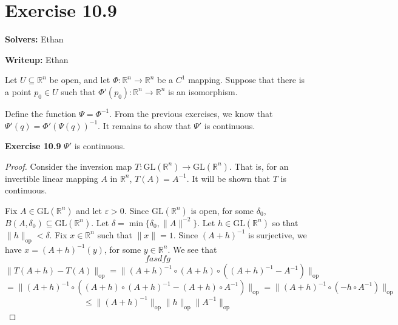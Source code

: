 \documentclass{article}
\newcommand{\op}{\mathrm{op}}
\newcommand{\GL}{\mathrm{GL}}
\theoremstyle{plain} %
\numberwithin{thm}{section} %
\theoremstyle{definition}
\begin{document}
    \section*{Exercise 10.9}
    \textbf{Solvers:} Ethan

    \noindent\textbf{Writeup:} Ethan

    Let \(U \subseteq \mathbb{R}^n\) be open, and let \(\Phi : \mathbb{R}^n \to \mathbb{R}^n\) be a \(C^1\) mapping. Suppose that there is a point \(p_0 \in U\) such that \(\Phi '(p_0) : \mathbb{R}^n \to \mathbb{R}^n\) is an isomorphism.

    \medskip

    Define the function \(\Psi = \Phi ^{-1}\). From the previous exercises, we know that \(\Psi '(q) = \Phi '(\Psi (q)) ^{-1}\). It remains to show that \(\Psi '\) is continuous.

    \noindent\textbf{Exercise 10.9} \(\Psi '\) is continuous.

    \begin{proof}
        Consider the inversion map \(T : \GL(\mathbb{R}^n) \to \GL(\mathbb{R}^n)\). That is, for an invertible linear mapping \(A\) in \(\mathbb{R}^n\), \(T(A) = A^{-1}\). It will be shown that \(T\) is continuous.

        Fix \(A \in \GL(\mathbb{R}^n)\) and let \(\varepsilon > 0\). Since \(\GL(\mathbb{R}^n)\) is open, for some \(\delta _0\), \(B(A, \delta _0) \subseteq \GL(\mathbb{R}^n)\). Let \(\delta = \min \{\delta _0, \|A\|^{-2}\}\). Let \(h \in \GL(\mathbb{R}^n)\) so that \(\|h\| _{\op} < \delta\). Fix \(x \in \mathbb{R}^n\) such that \(\|x\| = 1\). Since \((A + h)^{-1}\) is surjective, we have \(x = (A+h)^{-1} (y)\), for some \(y \in \mathbb{R}^n\). We see that
        \[
            fasdfg
        \]
        \[
            \|T(A + h) - T(A)\|_{\op} = \|(A+h)^{-1} \circ (A+h) \circ ((A+h)^{-1} - A^{-1})\|_{\op}
        \]
        \[
            = \|(A+h)^{-1} \circ ((A+h)\circ (A+h)^{-1} - (A+h) \circ A^{-1})\|_{\op} = \|(A+h)^{-1} \circ (- h \circ A^{-1})\|_{\op}
        \]
        \[
            \leq \|(A+h)^{-1}\|_{\op} \|h\|_{\op} \|A^{-1}\|_{\op}
        \]
    \end{proof}
\end{document}
